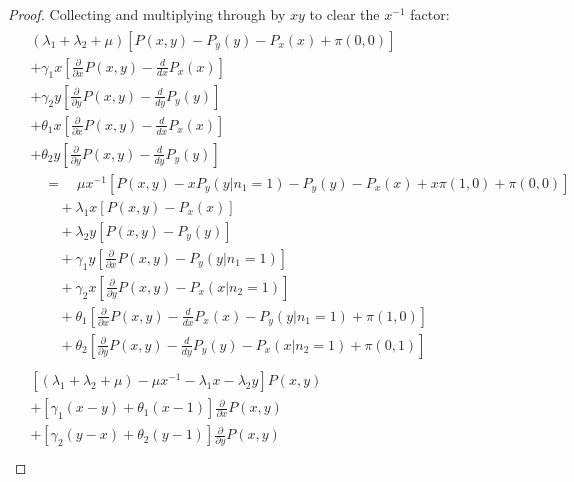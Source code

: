 \begin{proof}
    Collecting and multiplying through by $xy$ to clear the $x^{-1}$ factor:
    \begin{align}
        \begin{split}
            & (\lambda_1 + \lambda_2 + \mu) \left[
                P(x,y) - P_y(y) - P_x(x) + \pi(0,0)
            \right] \\
            & + \gamma_1 x \left[ \frac{\partial}{\partial x} P(x,y) - \frac{d}{dx} P_x(x) \right] \\
            & + \gamma_2 y \left[ \frac{\partial}{\partial y} P(x,y) - \frac{d}{dy} P_y(y) \right] \\
            & + \theta_1 x \left[ \frac{\partial}{\partial x} P(x,y) - \frac{d}{dx} P_x(x) \right] \\
            & + \theta_2 y \left[ \frac{\partial}{\partial y} P(x,y) - \frac{d}{dy} P_y(y) \right] \\
            & \quad = \quad \mu x^{-1} \left[
                P(x,y) - x P_y(y | n_1=1) - P_y(y) - P_x(x) + x \pi(1,0) + \pi(0,0)
            \right] \\
            & \quad \quad + \lambda_1 x \left[ P(x,y) - P_x(x) \right] \\
            & \quad \quad + \lambda_2 y \left[ P(x,y) - P_y(y) \right] \\
            & \quad \quad + \gamma_1 y \left[ \frac{\partial}{\partial x} P(x,y) - P_y(y | n_1=1) \right] \\
            & \quad \quad + \gamma_2 x \left[ \frac{\partial}{\partial y} P(x,y) - P_x(x | n_2=1) \right] \\
            & \quad \quad + \theta_1 \left[
                \frac{\partial}{\partial x} P(x,y) - \frac{d}{dx} P_x(x) - P_y(y | n_1=1) + \pi(1, 0)
            \right] \\
            & \quad \quad + \theta_2 \left[
                \frac{\partial}{\partial y} P(x,y) - \frac{d}{dy} P_y(y) - P_x(x | n_2=1) + \pi(0, 1)
            \right]
        \end{split} \nonumber \\
        \begin{split}
            & \left[ (\lambda_1+\lambda_2+\mu) - \mu x^{-1} - \lambda_1 x - \lambda_2 y \right] P(x,y) \\
            & + \left[ \gamma_1(x-y) + \theta_1(x-1) \right] \frac{\partial}{\partial x} P(x,y) \\
            & + \left[ \gamma_2(y-x) + \theta_2(y-1) \right] \frac{\partial}{\partial y} P(x,y) \\

\end{split}
\end{align}
\end{proof}
